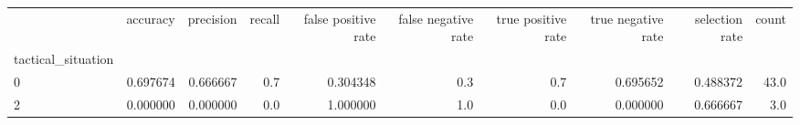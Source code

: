 \begin{tabular}{lrrrrrrrrr}
\toprule
{} &  accuracy &  precision &  recall &  false positive rate &  false negative rate &  true positive rate &  true negative rate &  selection rate &  count \\
tactical\_situation &           &            &         &                      &                      &                     &                     &                 &        \\
\midrule
0                  &  0.697674 &   0.666667 &     0.7 &             0.304348 &                  0.3 &                 0.7 &            0.695652 &        0.488372 &   43.0 \\
2                  &  0.000000 &   0.000000 &     0.0 &             1.000000 &                  1.0 &                 0.0 &            0.000000 &        0.666667 &    3.0 \\
\bottomrule
\end{tabular}
